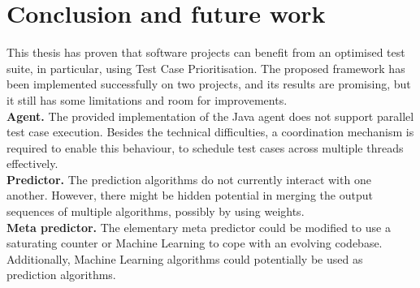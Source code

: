 \section{Conclusion and future work}
\noindent This thesis has proven that software projects can benefit from an optimised test suite, in particular, using Test Case Prioritisation. The proposed framework has been implemented successfully on two projects, and its results are promising, but it  still has some limitations and room for improvements.\\

\noindent \textbf{Agent.}
The provided implementation of the Java agent does not support parallel test case execution. Besides the technical difficulties, a coordination mechanism is required to enable this behaviour, to schedule test cases across multiple threads effectively.\\

\noindent \textbf{Predictor.}
The prediction algorithms do not currently interact with one another. However, there might be hidden potential in merging the output sequences of multiple algorithms, possibly by using weights.\\

\noindent \textbf{Meta predictor.}
The elementary meta predictor could be modified to use a saturating counter or Machine Learning to cope with an evolving codebase. Additionally, Machine Learning algorithms could potentially be used as prediction algorithms.